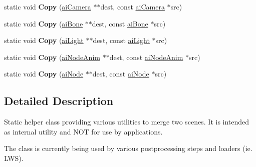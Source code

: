 \begin{DoxyCompactItemize}
\item 
\hypertarget{class_assimp_1_1_scene_combiner_a5f17cdfb88f986b45a3f7f4e10a7bfe0}{static void {\bfseries Copy} (\hyperlink{structai_camera}{ai\+Camera} $\ast$$\ast$dest, const \hyperlink{structai_camera}{ai\+Camera} $\ast$src)}\label{class_assimp_1_1_scene_combiner_a5f17cdfb88f986b45a3f7f4e10a7bfe0}

\item 
\hypertarget{class_assimp_1_1_scene_combiner_a3c50ee4865c09fc9753fd462b5e50894}{static void {\bfseries Copy} (\hyperlink{structai_bone}{ai\+Bone} $\ast$$\ast$dest, const \hyperlink{structai_bone}{ai\+Bone} $\ast$src)}\label{class_assimp_1_1_scene_combiner_a3c50ee4865c09fc9753fd462b5e50894}

\item 
\hypertarget{class_assimp_1_1_scene_combiner_a35e79f1d364b7e7b91be4f1070e57939}{static void {\bfseries Copy} (\hyperlink{structai_light}{ai\+Light} $\ast$$\ast$dest, const \hyperlink{structai_light}{ai\+Light} $\ast$src)}\label{class_assimp_1_1_scene_combiner_a35e79f1d364b7e7b91be4f1070e57939}

\item 
\hypertarget{class_assimp_1_1_scene_combiner_a2a08144e0a4ac81f2c1afac27847a600}{static void {\bfseries Copy} (\hyperlink{structai_node_anim}{ai\+Node\+Anim} $\ast$$\ast$dest, const \hyperlink{structai_node_anim}{ai\+Node\+Anim} $\ast$src)}\label{class_assimp_1_1_scene_combiner_a2a08144e0a4ac81f2c1afac27847a600}

\item 
\hypertarget{class_assimp_1_1_scene_combiner_a5105586419292aea4ace5ce38e8e90f7}{static void {\bfseries Copy} (\hyperlink{structai_node}{ai\+Node} $\ast$$\ast$dest, const \hyperlink{structai_node}{ai\+Node} $\ast$src)}\label{class_assimp_1_1_scene_combiner_a5105586419292aea4ace5ce38e8e90f7}

\end{DoxyCompactItemize}


\subsection{Detailed Description}
Static helper class providing various utilities to merge two scenes. It is intended as internal utility and N\+O\+T for use by applications. 

The class is currently being used by various postprocessing steps and loaders (ie. L\+W\+S). 

